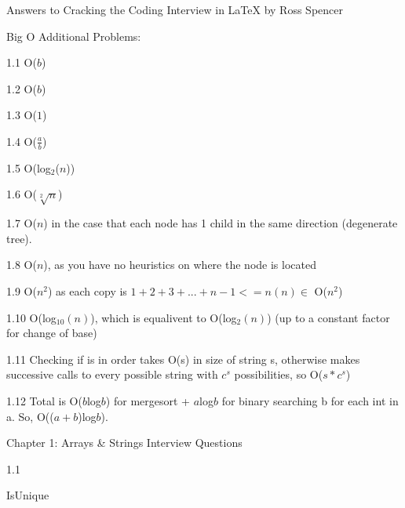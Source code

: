 \documentclass{article}
\begin{document}
Answers to Cracking the Coding Interview in \LaTeX
by Ross Spencer


Big O Additional Problems:

1.1 O($b$)

1.2 O($b$)

1.3 O($1$)

1.4 O($\frac{a}{b}$)

1.5 O(log$_2$($n$))

1.6 O($\sqrt[2]{n}$)

1.7 O($n$) in the case that each node has 1 child in the same direction (degenerate tree).

1.8 O($n$), as you have no heuristics on where the node is located

1.9 O($n^2$) as each copy is $1+2+3+...+n-1 <= n(n) \in$ O($n^2$)

1.10 O(log$_10(n)$), which is equalivent to O(log$_2(n)$) (up to a constant factor for change of base)

1.11 Checking if is in order takes O(s) in size of string s, otherwise makes successive calls to every possible string with $c^s$ possibilities, so O($s*c^s$)

1.12 Total is O($b$log$b$) for mergesort + $a$log$b$ for binary searching b for each int in a. So, O(($a+b$)log$b$).

\pagebreak

Chapter 1: Arrays \& Strings
Interview Questions

\linebreak

1.1 
\begin{algorithm}
 \caption{IsUnique}
\end{algorithm}
\end{document}

